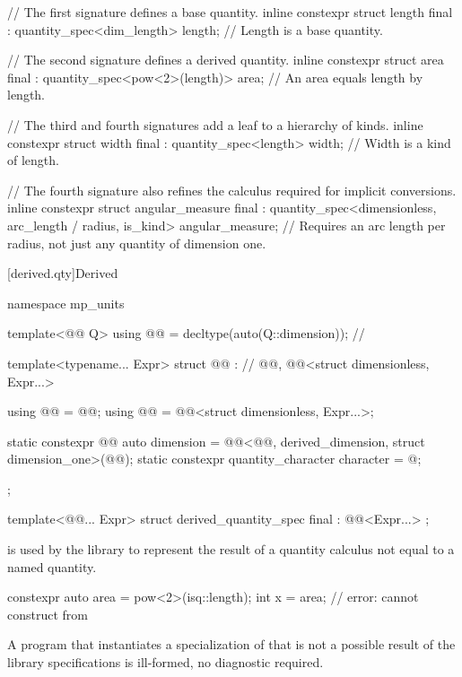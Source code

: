 \pnum
\begin{example}
\begin{codeblock}
// The first signature defines a base quantity.
inline constexpr struct length final : quantity_spec<dim_length> {
} length;  // Length is a base quantity.

// The second signature defines a derived quantity.
inline constexpr struct area final : quantity_spec<pow<2>(length)> {
} area;  // An area equals length by length.

// The third and fourth signatures add a leaf to a hierarchy of kinds.
inline constexpr struct width final : quantity_spec<length> {
} width;  // Width is a kind of length.

// The fourth signature also refines the calculus required for implicit conversions.
inline constexpr struct angular_measure final :
    quantity_spec<dimensionless, arc_length / radius, is_kind> {
} angular_measure;  // Requires an arc length per radius, not just any quantity of dimension one.
\end{codeblock}
\end{example}

[derived.qty]{Derived}

\begin{codeblock}
namespace mp_units {

template<@@ Q>
using @@ = decltype(auto(Q::dimension));  // \expos

template<typename... Expr>
struct @@ :                 // \expos
    @@,
    @@<struct dimensionless, Expr...> {
  using @@ = @@;
  using @@ = @@<struct dimensionless, Expr...>;

  static constexpr @@ auto dimension =
    @@<@@, derived_dimension, struct dimension_one>(@@{});
  static constexpr quantity_character character = @\seebelownc@;
};

template<@@... Expr>
struct derived_quantity_spec final : @@<Expr...> {};

}
\end{codeblock}

\pnum
{} is used by the library
to represent the result of a quantity calculus not equal to a named quantity.
\begin{example}
\begin{codeblock}
constexpr auto area = pow<2>(isq::length);
int x = area;  // error: cannot construct from 
\end{codeblock}
\end{example}
A program that instantiates a specialization of 
that is not a possible result of the library specifications
is ill-formed, no diagnostic required.

